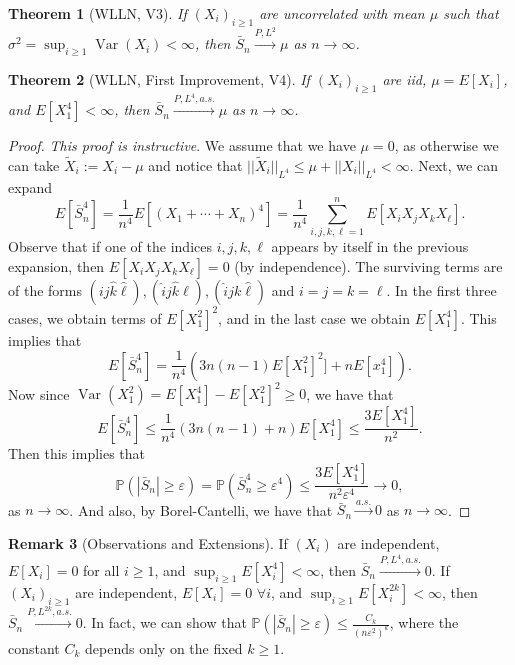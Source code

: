 \documentclass[12pt,reqno]{article}
\renewcommand{\emph}[1]{\textit{#1}}
\theoremstyle{plain}
\newtheorem{theorem}{Theorem}[section]
\theoremstyle{definition}
\newtheorem{remark}[theorem]{Remark}
\begin{document}
\begin{theorem}[WLLN, V3]
If $(X_i)_{i \geq 1}$ are uncorrelated with mean $\mu$ such that 
$\sigma^2 = \sup_{i \geq 1} \operatorname{Var}(X_i) < \infty$, then 
$\bar{S}_n \xrightarrow{P,L^2} \mu$ as $n \rightarrow \infty$. 
\end{theorem} 

\begin{theorem}[WLLN, First Improvement, V4]
If $(X_i)_{i \geq 1}$ are iid, $\mu = E[X_i]$, and $E[X_1^4] < \infty$, 
then $\bar{S}_n \xrightarrow{P,L^4,a.s.} \mu$ as $n \rightarrow \infty$. 
\end{theorem} 
\begin{proof} 
\emph{This proof is instructive}. We assume that we have $\mu = 0$, as otherwise 
we can take $\widetilde{X}_i := X_i - \mu$ and notice that 
$||\widetilde{X}_i||_{L^4} \leq \mu + ||X_i||_{L^4} < \infty$. 
Next, we can expand 
\[
E[\bar{S}_n^4] = \frac{1}{n^4} E[(X_1+\cdots+X_n)^4] = \frac{1}{n^4} 
     \sum_{i,j,k,\ell=1}^n E[X_iX_jX_kX_{\ell}]. 
\]
Observe that if one of the indices $i,j,k,\ell$ appears by itself in the 
previous expansion, then $E[X_iX_jX_kX_{\ell}] = 0$ (by independence). 
The surviving terms are of the forms 
$(ij\hat{k}\hat{\ell}),(\hat{i}j\hat{k}\ell),(\hat{i}jk\hat{\ell})$ and 
$i=j=k=\ell$. In the first three cases, we obtain terms of 
$E[X_1^2]^2$, and in the last case we obtain $E[X_1^4]$. This implies that 
\[
E[\bar{S}_n^4] = \frac{1}{n^4}\left(3n(n-1) E[X_1^2]^2] + 
     n E[x_1^4]\right). 
\]
Now since $\operatorname{Var}(X_1^2) = E[X_1^4] - E[X_1^2]^2 \geq 0$, 
we have that 
\[
E[\bar{S}_n^4] \leq \frac{1}{n^4}(3n(n-1)+n) E[X_1^4] \leq 
     \frac{3 E[X_1^4]}{n^2}. 
\]
Then this implies that 
\[
\mathbb{P}(|\bar{S}_n| \geq \varepsilon) = \mathbb{P}(\bar{S}_n^4 \geq 
     \varepsilon^4) \leq \frac{3 E[X_1^4]}{n^2\varepsilon^4} 
     \longrightarrow 0, 
\]
as $n \rightarrow \infty$. And also, by Borel-Cantelli, we have that 
$\bar{S}_n \xrightarrow{a.s.} 0$ as $n \rightarrow \infty$. 
\end{proof} 

\begin{remark}[Observations and Extensions] 
If $(X_i)$ are independent, $E[X_i] = 0$ for all $i \geq 1$, and 
$\sup_{i \geq 1} E[X_i^4] < \infty$, then 
$\bar{S}_n \xrightarrow{P,L^4,a.s.} 0$. 
If $(X_i)_{i \geq 1}$ are independent, 
$E[X_i] = 0$ $\forall i$, and $\sup_{i \geq 1} E[X_i^{2k}] < \infty$, then 
$\bar{S}_n \xrightarrow{P,L^{2k},a.s.} 0$. In fact, we can show that 
$\mathbb{P}(|\bar{S}_n| \geq \varepsilon) \leq 
 \frac{C_k}{(n\varepsilon^2)^k}$, where the constant $C_k$ depends only on 
the fixed $k \geq 1$. 
\end{remark}
\end{document}
